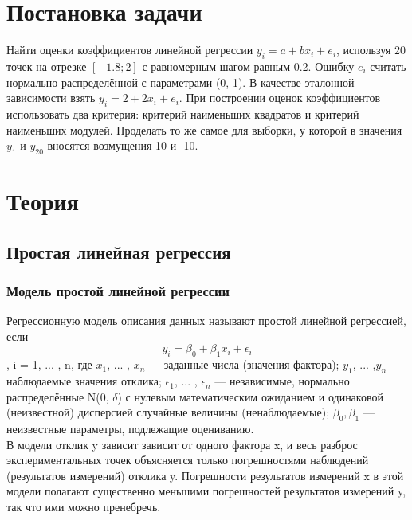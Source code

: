\documentclass[a4]{article}
\begin{document}
	
	\newpage
	\tableofcontents{}
	\newpage
	\listoffigures
	\newpage
	
	
	\section{Постановка задачи}
		Найти оценки коэффициентов линейной регрессии $y_i = a + bx_i + e_i$, используя 20 точек на отрезке $[-1.8; 2]$ с равномерным шагом равным 0.2. Ошибку $e_i$ считать нормально распределённой с параметрами (0, 1). В качестве эталонной зависимости взять $y_i = 2 + 2x_i + e_i$. При построении оценок коэффициентов использовать два критерия: критерий наименьших квадратов и критерий наименьших модулей. Проделать то же самое для выборки, у которой в значения $y_1$ и $y_20$ вносятся возмущения 10 и -10.
	\section{Теория}
		\subsection{Простая линейная регрессия}
		\subsubsection{Модель простой линейной регрессии}
			Регрессионную модель описания данных называют простой линейной регрессией, если
			$$y_i = \beta_0 + \beta_1x_i + \epsilon_i$$ , i = 1, ... , n, где $x_1$, ... , $x_n$ — заданные числа (значения фактора); $y_1$, ... ,$y_n$  — наблюдаемые значения отклика; $\epsilon_1$, ... , $\epsilon_n$ — независимые, нормально распределённые N(0, $\delta$) с нулевым математическим ожиданием и одинаковой (неизвестной) дисперсией случайные величины (ненаблюдаемые); $\beta_0, \beta_1$ — неизвестные параметры, подлежащие оцениванию.\\
			В модели отклик y зависит зависит от одного фактора x, и весь разброс экспериментальных точек объясняется только погрешностями наблюдений (результатов измерений) отклика y. Погрешности результатов измерений x в этой модели полагают существенно меньшими погрешностей результатов измерений y, так что ими можно пренебречь.
\end{document}
